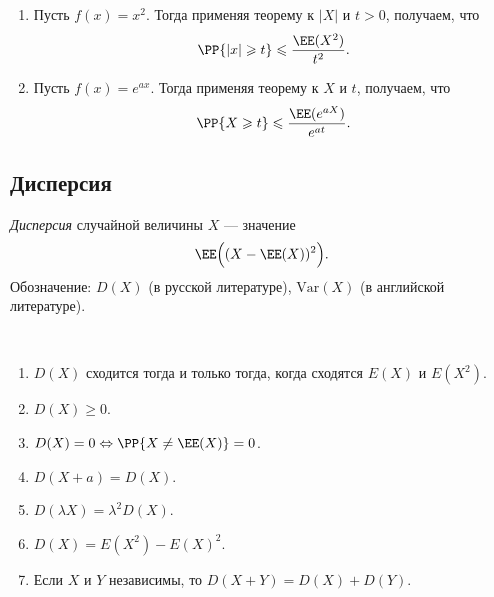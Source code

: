 \documentclass[12pt,a4paper]{article}
\newcommand{\Var}{\ensuremath{\mathrm{Var}}\xspace}
\begin{document}
    \begin{example}
        \begin{enumerate}
            \item Пусть $f(x) = x^2$. Тогда применяя теорему к $|X|$ и $t > 0$, получаем, что
                \[\PP\{|x| \geqslant t\} \leqslant \frac{\EE(X^2)}{t^2}.\]
            \item Пусть $f(x) = e^{ax}$. Тогда применяя теорему к $X$ и $t$, получаем, что
                \[\PP\{X \geqslant t\} \leqslant \frac{\EE(e^{aX})}{e^{at}}.\]
        \end{enumerate}
    \end{example}

    \subsection{Дисперсия}

    \begin{definition}
        \emph{Дисперсия} случайной величины $X$ --- значение
        \[\EE\Bigl((X-\EE(X))^2\Bigr).\]
        Обозначение: $D(X)$ (в русской литературе), $\Var(X)$ (в английской литературе).
    \end{definition}

    \begin{lemma}\ 
        \begin{enumerate}
            \item $D(X)$ сходится тогда и только тогда, когда сходятся $E(X)$ и $E(X^2)$.
            \item $D(X) \geqslant 0$.
            \item $D(X) = 0 \Leftrightarrow \PP\{X \neq \EE(X)\} = 0$.
            \item $D(X + a) = D(X)$.
            \item $D(\lambda X) = \lambda^2 D(X)$.
            \item $D(X) = E(X^2) - E(X)^2$.
            \item Если $X$ и $Y$ независимы, то $D(X + Y) = D(X) + D(Y)$.
        \end{enumerate}
    \end{lemma}
\end{document}
